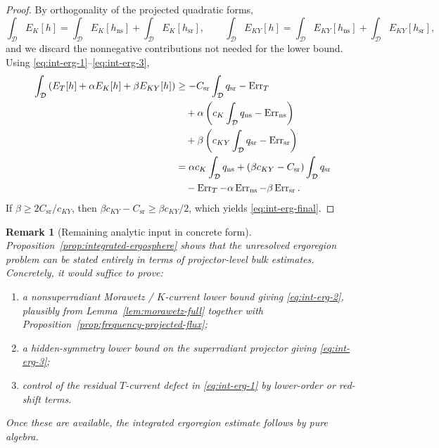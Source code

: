 \documentclass[12pt,a4paper]{article}
\newtheorem{remark}[theorem]{Remark}
\begin{document}
\begin{proof}
By orthogonality of the projected quadratic forms,
\begin{equation}
\int_{\mathcal{D}} E_K[h] = \int_{\mathcal{D}} E_K[h_{\mathrm{ns}}] + \int_{\mathcal{D}} E_K[h_{\mathrm{sr}}],
\qquad
\int_{\mathcal{D}} E_{KY}[h] = \int_{\mathcal{D}} E_{KY}[h_{\mathrm{ns}}] + \int_{\mathcal{D}} E_{KY}[h_{\mathrm{sr}}],
\end{equation}
and we discard the nonnegative contributions not needed for the lower bound. Using \eqref{eq:int-erg-1}--\eqref{eq:int-erg-3},
\begin{align}
\int_{\mathcal{D}} \left(E_T[h] + \alpha E_K[h] + \beta E_{KY}[h]\right)
&\ge - C_{\mathrm{sr}} \int_{\mathcal{D}} q_{\mathrm{sr}} - \operatorname{Err}_T \notag\\
&\quad + \alpha \left(c_K \int_{\mathcal{D}} q_{\mathrm{ns}} - \operatorname{Err}_{\mathrm{ns}}\right) \notag\\
&\quad + \beta \left(c_{KY} \int_{\mathcal{D}} q_{\mathrm{sr}} - \operatorname{Err}_{\mathrm{sr}}\right) \notag\\
&= \alpha c_K \int_{\mathcal{D}} q_{\mathrm{ns}}
 + (\beta c_{KY} - C_{\mathrm{sr}})\int_{\mathcal{D}} q_{\mathrm{sr}} \notag\\
&\quad - \operatorname{Err}_T - \alpha \operatorname{Err}_{\mathrm{ns}} - \beta \operatorname{Err}_{\mathrm{sr}}.
\end{align}
If $\beta \ge 2C_{\mathrm{sr}}/c_{KY}$, then $\beta c_{KY} - C_{\mathrm{sr}} \ge \beta c_{KY}/2$, which yields \eqref{eq:int-erg-final}.
\end{proof}

\begin{remark}[Remaining analytic input in concrete form]
Proposition~\ref{prop:integrated-ergosphere} shows that the unresolved ergoregion problem can be stated entirely in terms of projector-level bulk estimates. Concretely, it would suffice to prove:
\begin{enumerate}
    \item a nonsuperradiant Morawetz / $K$-current lower bound giving \eqref{eq:int-erg-2}, plausibly from Lemma~\ref{lem:morawetz-full} together with Proposition~\ref{prop:frequency-projected-flux};
    \item a hidden-symmetry lower bound on the superradiant projector giving \eqref{eq:int-erg-3};
    \item control of the residual $T$-current defect in \eqref{eq:int-erg-1} by lower-order or red-shift terms.
\end{enumerate}
Once these are available, the integrated ergoregion estimate follows by pure algebra.
\end{remark}
\end{document}
